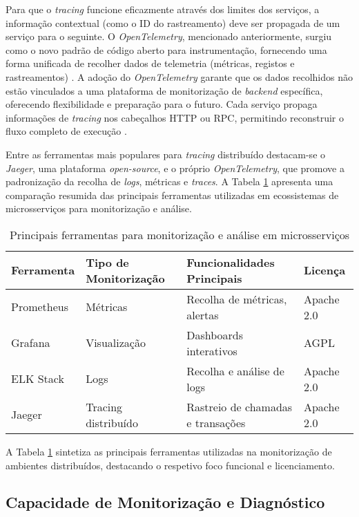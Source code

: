 Para que o \textit{tracing} funcione eficazmente através dos limites dos serviços, a informação contextual (como o ID do rastreamento) deve ser propagada de um serviço para o seguinte. O \textit{ OpenTelemetry}, mencionado anteriormente, surgiu como o novo padrão de código aberto para instrumentação, fornecendo uma forma unificada de recolher dados de telemetria (métricas, registos e rastreamentos) \cite{Thakur2022}. A adoção do \textit{ OpenTelemetry} garante que os dados recolhidos não estão vinculados a uma plataforma de monitorização de \textit{backend} específica, oferecendo flexibilidade e preparação para o futuro. Cada serviço propaga informações de \textit{tracing} nos cabeçalhos HTTP ou RPC, permitindo reconstruir o fluxo completo de execução \cite{Sigelman2010}.

Entre as ferramentas mais populares para \textit{tracing} distribuído destacam-se o \textit{ Jaeger}, uma plataforma \textit{open-source}, e o próprio \textit{ OpenTelemetry}, que promove a padronização da recolha de \textit{logs}, métricas e \textit{traces}. A Tabela \ref{tab:monitoring-tools} apresenta uma comparação resumida das principais ferramentas utilizadas em ecossistemas de microsserviços para monitorização e análise.

\begin{table}[h]
\centering
\caption{Principais ferramentas para monitorização e análise em microsserviços}
\label{tab:monitoring-tools}
\begin{tabular}{|l|l|l|l|}
\hline
\textbf{Ferramenta} & \textbf{Tipo de Monitorização} & \textbf{Funcionalidades Principais} & \textbf{Licença} \\ \hline
Prometheus & Métricas & Recolha de métricas, alertas & Apache 2.0 \\ \hline
Grafana & Visualização & Dashboards interativos & AGPL \\ \hline
ELK Stack & Logs & Recolha e análise de logs & Apache 2.0 \\ \hline
Jaeger & Tracing distribuído & Rastreio de chamadas e transações & Apache 2.0 \\ \hline
\end{tabular}
\end{table}

A Tabela \ref{tab:monitoring-tools} sintetiza as principais ferramentas utilizadas na monitorização de ambientes distribuídos, destacando o respetivo foco funcional e licenciamento.


\subsection{Capacidade de Monitorização e Diagnóstico}

